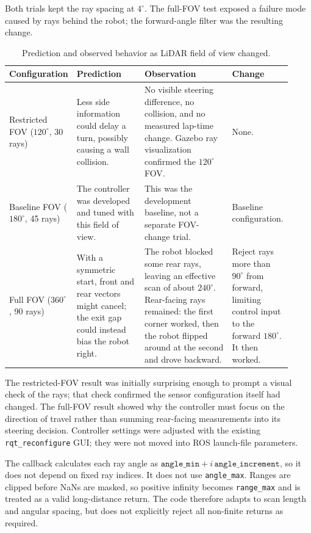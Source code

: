 \documentclass[10pt,a4paper]{article}
\begin{document}
Both trials kept the ray spacing at $4^\circ$. The full-FOV test exposed a
failure mode caused by rays behind the robot; the forward-angle filter was the
resulting change.

\begin{table}[H]
\centering
\small
\renewcommand{\arraystretch}{1.2}
\begin{tabular}{@{}p{0.16\linewidth}p{0.24\linewidth}p{0.31\linewidth}p{0.21\linewidth}@{}}
\toprule
Configuration & Prediction & Observation & Change \\
\midrule
Restricted FOV ($120^\circ$, 30 rays) &
Less side information could delay a turn, possibly causing a wall collision. &
No visible steering difference, no collision, and no measured lap-time change. Gazebo ray visualization confirmed the $120^\circ$ FOV. &
None. \\
\addlinespace
Baseline FOV ($180^\circ$, 45 rays) &
The controller was developed and tuned with this field of view. &
This was the development baseline, not a separate FOV-change trial. &
Baseline configuration. \\
\addlinespace
Full FOV ($360^\circ$, 90 rays) &
With a symmetric start, front and rear vectors might cancel; the exit gap could instead bias the robot right. &
The robot blocked some rear rays, leaving an effective scan of about $240^\circ$. Rear-facing rays remained: the first corner worked, then the robot flipped around at the second and drove backward. &
Reject rays more than $90^\circ$ from forward, limiting control input to the forward $180^\circ$. It then worked. \\
\bottomrule
\end{tabular}
\caption{Prediction and observed behavior as LiDAR field of view changed.}
\label{tab:lidar-fov-tests}
\end{table}

The restricted-FOV result was initially surprising enough to prompt a visual
check of the rays; that check confirmed the sensor configuration itself had
changed. The full-FOV result showed why the controller must focus on the
direction of travel rather than summing rear-facing measurements into its
steering decision. Controller settings were adjusted with the existing
\texttt{rqt\_reconfigure} GUI; they were not moved into ROS launch-file
parameters.

The callback calculates each ray angle as
$\texttt{angle\_min}+i\,\texttt{angle\_increment}$, so it does not depend on
fixed ray indices. It does not use \texttt{angle\_max}. Ranges are clipped
before NaNs are masked, so positive infinity becomes \texttt{range\_max} and
is treated as a valid long-distance return. The code therefore adapts to scan
length and angular spacing, but does not explicitly reject all non-finite
returns as required.
\end{document}
